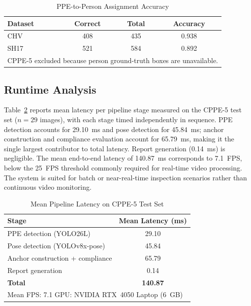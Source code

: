 \documentclass[conference]{IEEEtran}
\begin{document}
\begin{table}[!htbp]
    \centering
    \caption{PPE-to-Person Assignment Accuracy}
    \label{tab:l2}
    \begin{tabular}{lccc}
        \hline
        \textbf{Dataset} &
        \textbf{Correct} & \textbf{Total} &
        \textbf{Accuracy} \\
        \hline
        CHV & 408 & 435 & 0.938 \\
        SH17& 521 & 584 & 0.892 \\
        \hline
        \multicolumn{4}{l}{\footnotesize CPPE-5 excluded because person ground-truth boxes are unavailable.} \\
    \end{tabular}
\end{table}


\subsection{Runtime Analysis}
Table~\ref{tab:runtime} reports mean latency per pipeline stage measured on the CPPE-5 test set ($n = 29$ images), with each stage timed independently in sequence. PPE detection accounts for 29.10~ms and pose detection for 45.84~ms; anchor construction and compliance evaluation account for 65.79~ms, making it the single largest contributor to total latency. Report generation (0.14~ms) is negligible. The mean end-to-end latency of 140.87~ms corresponds to 7.1~FPS, below the 25~FPS threshold commonly required for real-time video processing. The system is suited for batch or near-real-time inspection scenarios rather than continuous video monitoring.

\begin{table}[!htbp]
    \centering
    \caption{Mean Pipeline Latency on CPPE-5 Test Set}
    \label{tab:runtime}
    \begin{tabular}{lc}
        \hline
        \textbf{Stage} & \textbf{Mean Latency (ms)} \\
        \hline
        PPE detection (YOLO26L)          & 29.10 \\
        Pose detection (YOLOv8x-pose)    & 45.84 \\
        Anchor construction + compliance & 65.79 \\
        Report generation                &  0.14 \\
        \hline
        \textbf{Total}                   & \textbf{140.87} \\
        \hline
        \multicolumn{2}{l}{\footnotesize Mean FPS: 7.1 \quad
        GPU: NVIDIA RTX~4050 Laptop (6~GB)}
    \end{tabular}
\end{table}
\end{document}
